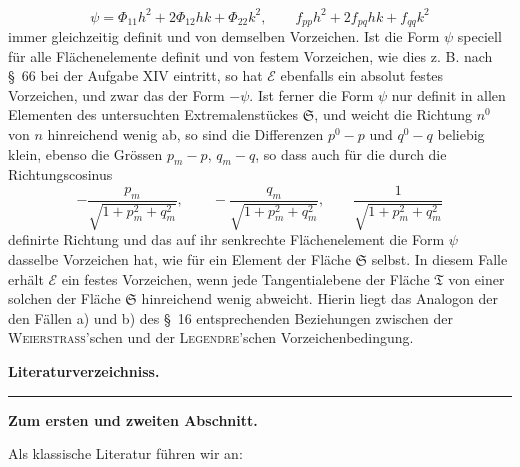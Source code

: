 \documentclass[11pt,a4paper,leqno]{article}
\begin{document}
\[
\psi=\Phi_{11}h^2+2\Phi_{12}hk+\Phi_{22}k^2,\qquad
f_{pp}h^2+2f_{pq}hk+f_{qq}k^2
\]
immer gleichzeitig definit und von demselben Vorzeichen. Ist die Form $\psi$
speciell für alle Flächenelemente definit und von festem Vorzeichen, wie dies
z. B. nach \S~66 bei der Aufgabe XIV eintritt, so hat $\mathcal{E}$ ebenfalls
ein absolut festes Vorzeichen, und zwar das der Form $-\psi$. Ist ferner die
Form $\psi$ nur definit in allen Elementen des untersuchten Extremalenstückes
$\mathfrak{S}$, und weicht die Richtung $n^0$ von $n$ hinreichend wenig ab,
so sind die Differenzen $p^0-p$ und $q^0-q$ beliebig klein, ebenso die Grössen
$p_m-p$, $q_m-q$, so dass auch für die durch die Richtungscosinus
\[
-\frac{p_m}{\sqrt{1+p_m^2+q_m^2}},\qquad
-\frac{q_m}{\sqrt{1+p_m^2+q_m^2}},\qquad
\frac{1}{\sqrt{1+p_m^2+q_m^2}}
\]
definirte Richtung und das auf ihr senkrechte Flächenelement die Form $\psi$
dasselbe Vorzeichen hat, wie für ein Element der Fläche $\mathfrak{S}$
selbst. In diesem Falle erhält $\mathcal{E}$ ein festes Vorzeichen, wenn jede
Tangentialebene der Fläche $\mathfrak{T}$ von einer solchen der Fläche
$\mathfrak{S}$ hinreichend wenig abweicht. Hierin liegt das Analogon der den
Fällen a) und b) des \S~16 entsprechenden Beziehungen zwischen der
\textsc{Weierstrass}'schen und der \textsc{Legendre}'schen Vorzeichenbedingung.


\begin{center}
{\Large\bfseries Literaturverzeichniss.}

\rule{2.4cm}{0.4pt}

{\large\bfseries Zum ersten und zweiten Abschnitt.}
\end{center}

\noindent Als klassische Literatur führen wir an:
\end{document}
